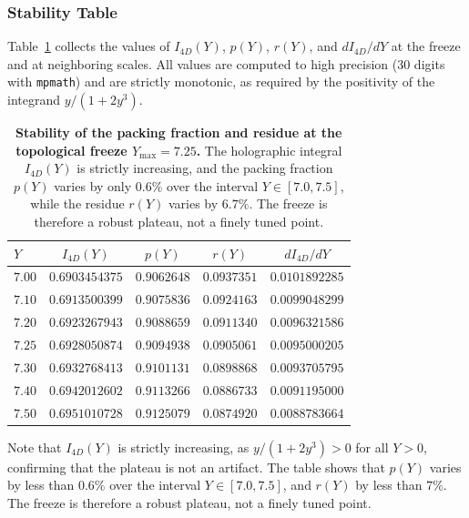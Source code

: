\documentclass[12pt,oneside,openany]{book}
\begin{document}
\subsubsection{Stability Table}

Table~\ref{tab:packing-stability} collects the values of $I_{4D}(Y)$, $p(Y)$, $r(Y)$, and $dI_{4D}/dY$ at the freeze and at neighboring scales. All values are computed to high precision (30 digits with \texttt{mpmath}) and are strictly monotonic, as required by the positivity of the integrand $y/(1+2y^3)$.

\begin{table}[htbp]
\centering
\caption{\textbf{Stability of the packing fraction and residue at the topological freeze $Y_{\max} = 7.25$.} The holographic integral $I_{4D}(Y)$ is strictly increasing, and the packing fraction $p(Y)$ varies by only $0.6\%$ over the interval $Y \in [7.0, 7.5]$, while the residue $r(Y)$ varies by $6.7\%$. The freeze is therefore a robust plateau, not a finely tuned point.}
\label{tab:packing-stability}
\small
\begin{tabular}{@{}lcccc@{}}
\toprule
$Y$ & $I_{4D}(Y)$ & $p(Y)$ & $r(Y)$ & $dI_{4D}/dY$ \\
\midrule
$7.00$ & $0.6903454375$ & $0.9062648$ & $0.0937351$ & $0.0101892285$ \\
$7.10$ & $0.6913500399$ & $0.9075836$ & $0.0924163$ & $0.0099048299$ \\
$7.20$ & $0.6923267943$ & $0.9088659$ & $0.0911340$ & $0.0096321586$ \\
$\mathbf{7.25}$ & $\mathbf{0.6928050874}$ & $\mathbf{0.9094938}$ & $\mathbf{0.0905061}$ & $\mathbf{0.0095000205}$ \\
$7.30$ & $0.6932768413$ & $0.9101131$ & $0.0898868$ & $0.0093705795$ \\
$7.40$ & $0.6942012602$ & $0.9113266$ & $0.0886733$ & $0.0091195000$ \\
$7.50$ & $0.6951010728$ & $0.9125079$ & $0.0874920$ & $0.0088783664$ \\
\bottomrule
\end{tabular}
\end{table}

Note that $I_{4D}(Y)$ is strictly increasing, as $y/(1+2y^3) > 0$ for all $Y > 0$, confirming that the plateau is not an artifact. The table shows that $p(Y)$ varies by less than $0.6\%$ over the interval $Y \in [7.0, 7.5]$, and $r(Y)$ by less than $7\%$. The freeze is therefore a robust plateau, not a finely tuned point.
\end{document}
